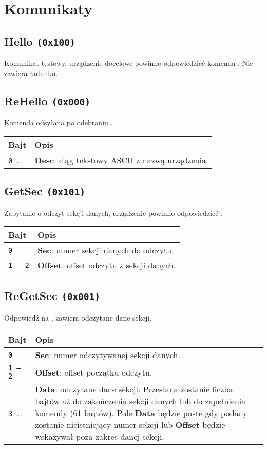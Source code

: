 \newpage

\section{Komunikaty}
\label{Sec_komunikaty}

\subsection{Hello \texttt{(0x100)}}
\label{hello}
Komunikat testowy, urządzenie docelowe powinno odpowiedzieć komendą . Nie zawiera ładunku.

\subsection{ReHello \texttt{(0x000)}}
\label{reHello}
Komenda odsyłana po odebraniu .
\begin{longtable}{|p{\BWIDTH}|p{\OWIDTH}|}
	\hline
	\textbf{Bajt} & \textbf{Opis}\\ 
	\hline
	\hline
	\texttt{0} ... & \textbf{Desc}: ciąg tekstowy ASCII z nazwą urządzenia.\\
	\hline
\end{longtable}

\subsection{GetSec \texttt{(0x101)}}
\label{getSec}
Zapytanie o odczyt sekcji danych, urządzenie powinno odpowiedzieć .
\begin{longtable}{|p{\BWIDTH}|p{\OWIDTH}|}
	\hline
	\textbf{Bajt} & \textbf{Opis}\\ 
	\hline
	\hline
	\texttt{0} & \textbf{Sec}: numer sekcji danych do odczytu.\\
	\hline
	\texttt{1 -- 2} & \textbf{Offset}: offset odczytu z sekcji danych.\\
	\hline
\end{longtable}

\subsection{ReGetSec \texttt{(0x001)}}
\label{reGetSec}
Odpowiedź na , zawiera odczytane dane sekcji.
\begin{longtable}{|p{\BWIDTH}|p{\OWIDTH}|}
	\hline
	\textbf{Bajt} & \textbf{Opis}\\ 
	\hline
	\hline
	\texttt{0} & \textbf{Sec}: numer odczytywanej sekcji danych.\\
	\hline
	\texttt{1 -- 2} & \textbf{Offset}: offset początku odczytu.\\
	\hline
	\texttt{3} ... & \textbf{Data}: odczytane dane sekcji. Przesłana zostanie liczba bajtów aż do zakończenia sekcji danych lub do zapełnienia komendy (61 bajtów). Pole \textbf{Data} będzie puste gdy podany zostanie nieistniejący numer sekcji lub \textbf{Offset} będzie wskazywał poza zakres danej sekcji.\\
	\hline
\end{longtable}

